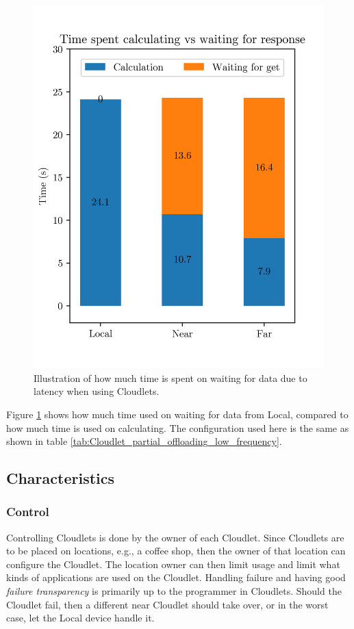 \begin{figure}[t]
    \centering
    \includegraphics[scale=1]{chapters/6_evaluation/figures/bar_local_near_far_compare_low_interaction.png}
    \caption{Illustration of how much time is spent on waiting for data due to latency when using Cloudlets.}
    \label{fig:Cloudlet_latency_bar}
\end{figure}
Figure \ref{fig:Cloudlet_latency_bar} shows how much time used on waiting for data from Local, compared to how much time is used on calculating. The configuration used here is the same as shown in table \ref{tab:Cloudlet_partial_offloading_low_frequency}.




\subsection{Characteristics}
\subsubsection{Control}
Controlling Cloudlets is done by the owner of each Cloudlet. Since Cloudlets are to be placed on locations, e.g., a coffee shop, then the owner of that location can configure the Cloudlet. The location owner can then limit usage and limit what kinds of applications are used on the Cloudlet. Handling failure and having good \textit{failure transparency} is primarily up to the programmer in Cloudlets. Should the Cloudlet fail, then a different near Cloudlet should take over, or in the worst case, let the Local device handle it. 

